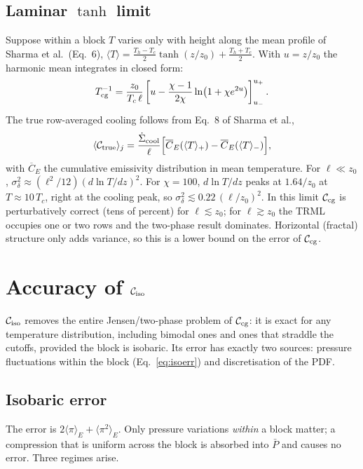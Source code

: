 \documentclass[11pt]{article}
\newcommand{\Ctrue}{\mathcal{C}_{\rm true}}
\newcommand{\Ccg}{\mathcal{C}_{\rm cg}}
\newcommand{\Ciso}{\mathcal{C}_{\rm iso}}
\newcommand{\Tcg}{T_{\rm cg}}
\begin{document}
\subsection{Laminar $\tanh$ limit}
Suppose within a block $T$ varies only with height along the mean profile of Sharma et al.\ (Eq.~6), $\langle T\rangle=\tfrac{T_h-T_c}{2}\tanh(z/z_0)+\tfrac{T_h+T_c}{2}$. With $u=z/z_0$ the harmonic mean integrates in closed form:
\begin{equation}
\Tcg^{-1}=\frac{z_0}{T_c\,\ell}\left[u-\frac{\chi-1}{2\chi}\ln\!\left(1+\chi e^{2u}\right)\right]_{u_-}^{u_+}.
\end{equation}
The true row-averaged cooling follows from Eq.~8 of Sharma et al.,
\begin{equation}
\langle\Ctrue\rangle_j=\frac{\dot\Sigma_{\rm cool}}{\ell}\Big[\overline C_E(\langle T\rangle_+)-\overline C_E(\langle T\rangle_-)\Big],
\end{equation}
with $\overline C_E$ the cumulative emissivity distribution in mean temperature. For $\ell\ll z_0$, $\sigma_\delta^2\approx(\ell^2/12)(d\ln T/dz)^2$. For $\chi=100$, $d\ln T/dz$ peaks at $1.64/z_0$ at $T\approx10\,T_c$, right at the cooling peak, so $\sigma_\delta^2\lesssim0.22\,(\ell/z_0)^2$. In this limit $\Ccg$ is perturbatively correct (tens of percent) for $\ell\lesssim z_0$; for $\ell\gtrsim z_0$ the TRML occupies one or two rows and the two-phase result dominates. Horizontal (fractal) structure only adds variance, so this is a lower bound on the error of $\Ccg$.

\section{Accuracy of $\Ciso$}

$\Ciso$ removes the entire Jensen/two-phase problem of $\Ccg$: it is exact for any temperature distribution, including bimodal ones and ones that straddle the cutoffs, provided the block is isobaric. Its error has exactly two sources: pressure fluctuations within the block (Eq.~\ref{eq:isoerr}) and discretisation of the PDF.

\subsection{Isobaric error}

The error is $2\langle\pi\rangle_E+\langle\pi^2\rangle_E$. Only pressure variations \emph{within} a block matter; a compression that is uniform across the block is absorbed into $\bar P$ and causes no error. Three regimes arise.
\end{document}
